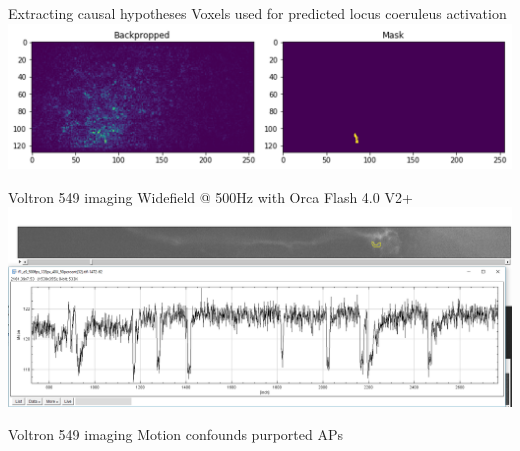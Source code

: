 \begin{frame}{ Extracting causal hypotheses }{Voxels used for predicted locus coeruleus activation}
    \includegraphics[width=\textwidth]{media/backprop_mask.png}
\end{frame}{}

\begin{frame}{ Voltron 549 imaging }{ Widefield @ 500Hz with Orca Flash 4.0 V2+}
    \includegraphics[width=\textwidth]{media/voltron_example_trace}
\end{frame}{}

\begin{frame}{ Voltron 549 imaging }{ Motion confounds purported APs}
\end{frame}{}

